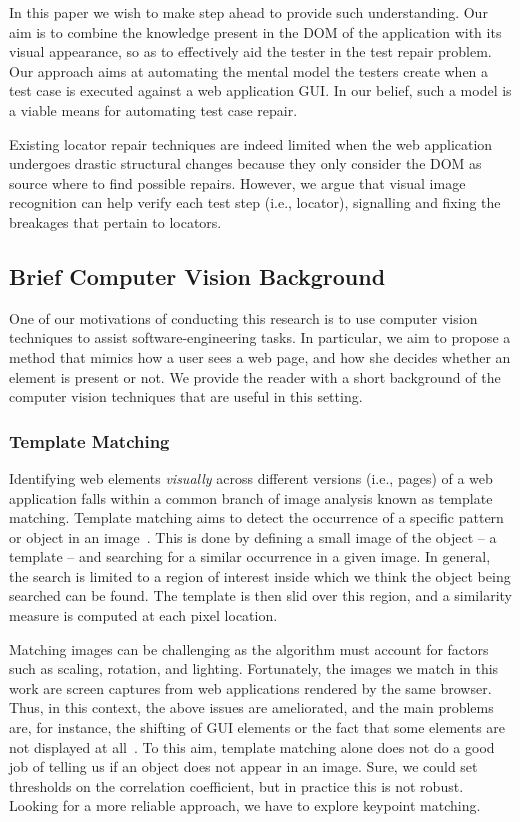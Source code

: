 In this paper we wish to make step ahead to provide such understanding. 
Our aim is to combine the knowledge present in the DOM of the application with its visual appearance, so as to effectively aid the tester in the test repair problem. Our approach aims at automating the mental model the testers create when a test case is executed against a web application GUI. In our belief, such a model is a viable means for automating test case repair.

Existing locator repair techniques are indeed limited when the web application undergoes drastic structural changes because they only consider the DOM as source where to find possible repairs.
However, we argue that visual image recognition can help verify each test step (i.e., locator), signalling and fixing the breakages that pertain to locators.

\subsection{Brief Computer Vision Background}

One of our motivations of conducting this research is to use computer vision techniques to assist software-engineering tasks. In particular, we aim to propose a method that mimics how a user sees a web page, and how she decides whether an element is present or not. We provide the reader with a short background of the computer vision techniques that are useful in this setting.

\subsubsection{Template Matching}

Identifying web elements \textit{visually} across different versions (i.e., pages) of a web application falls within a common branch of image analysis known as template matching. 
%
Template matching aims to detect the occurrence of a specific pattern or object in an image~\cite{Brunelli:2009:TMT:1643435}. This is done by defining a small image of the object -- a template -- and searching for a similar occurrence in a given image. In general, the search is limited to a region of interest inside which we think the object being searched can be found. The template is then slid over this region, and a similarity measure is computed at each pixel location.

Matching images can be challenging as the algorithm must account for factors such as scaling, rotation, and lighting. Fortunately, the images we match in this work are screen captures from web applications rendered by the same browser. Thus, in this context, the above issues are ameliorated, and the main problems are, for instance, the shifting of GUI elements or the fact that some elements are not displayed at all~\cite{}.
% 
To this aim, template matching alone does not do a good job of telling us if an object does not appear in an image. Sure, we could set thresholds on the correlation coefficient, but in practice this is not robust. Looking for a more reliable approach, we have to explore keypoint matching.

